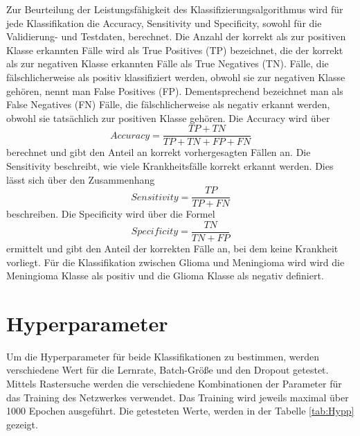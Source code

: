 Zur Beurteilung der Leistungsfähigkeit des Klassifizierungsalgorithmus wird für jede Klassifikation die Accuracy, 
Sensitivity und Specificity, sowohl für die Validierung- und Testdaten, berechnet.
Die Anzahl der korrekt als zur positiven Klasse erkannten Fälle wird als True Positives (TP) bezeichnet, die der korrekt als zur negativen Klasse erkannten Fälle als True Negatives (TN).
Fälle, die fälschlicherweise als positiv klassifiziert werden, obwohl sie zur negativen Klasse gehören, nennt man False Positives (FP).
Dementsprechend bezeichnet man als False Negatives (FN) Fälle, die fälschlicherweise als negativ erkannt werden, obwohl sie tatsächlich zur positiven Klasse gehören.
Die Accuracy wird über
\begin{equation}
  Accuracy = \frac{TP + TN}{TP + TN + FP + FN}
\end{equation}
berechnet und gibt den Anteil an korrekt vorhergesagten Fällen an. 
Die Sensitivity beschreibt, wie viele Krankheitsfälle korrekt erkannt werden. 
Dies lässt sich über den Zusammenhang
\begin{equation}
  Sensitivity = \frac{TP}{TP + FN}
\end{equation}
beschreiben.
Die Specificity wird über die Formel
\begin{equation}
  Specificity = \frac{TN}{TN + FP}
\end{equation}
ermittelt und gibt den Anteil der korrekten Fälle an, bei dem keine Krankheit vorliegt. 
Für die Klassifikation zwischen Glioma und Meningioma wird wird die Meningioma Klasse als positiv und die Glioma Klasse als negativ definiert.

\section{Hyperparameter}\label{sec:Hyperparameter}
Um die Hyperparameter für beide Klassifikationen zu bestimmen, werden verschiedene Wert für die
Lernrate, Batch-Größe und den Dropout getestet.
Mittels Rastersuche werden die verschiedene Kombinationen der Parameter für das Training des Netzwerkes verwendet. 
Das Training wird jeweils maximal über 1000 Epochen ausgeführt.
Die getesteten Werte, werden in der Tabelle \ref{tab:Hypp} gezeigt.

